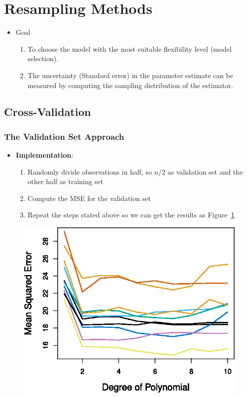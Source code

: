 \documentclass[12pt,a4paper]{article}%
\theoremstyle{definition}
\theoremstyle{plain}
\numberwithin{equation}{section}
\begin{document}
\setcounter{section}{4}
\section{Resampling Methods}

\begin{itemize}
\item Goal
	\begin{enumerate}
	\item To choose the model with the most suitable flexibility level (model selection).
	\item The uncertainty (Standard error) in the parameter estimate can be measured by computing the sampling distribution of the estimator.
	\end{enumerate}
\end{itemize}

\subsection{\textbf{Cross-Validation}}
\subsubsection{\textbf{The Validation Set Approach}}
\begin{itemize}
\item \textbf{Implementation}:
	\begin{enumerate}
	\item Randomly divide observations in half, so $n/2$ as validation set and the other half as training set
	\item Compute the MSE for the validation set
	\item Repeat the steps stated above so we can get the results as Figure~\ref{figure-5.2}
	\end{enumerate}
\end{itemize}

\begin{figure}[H]
\centering
\includegraphics[scale=1]{images//5_2.eps}
\\~\\
\caption{}\label{figure-5.2}
\end{figure}
\end{document}
